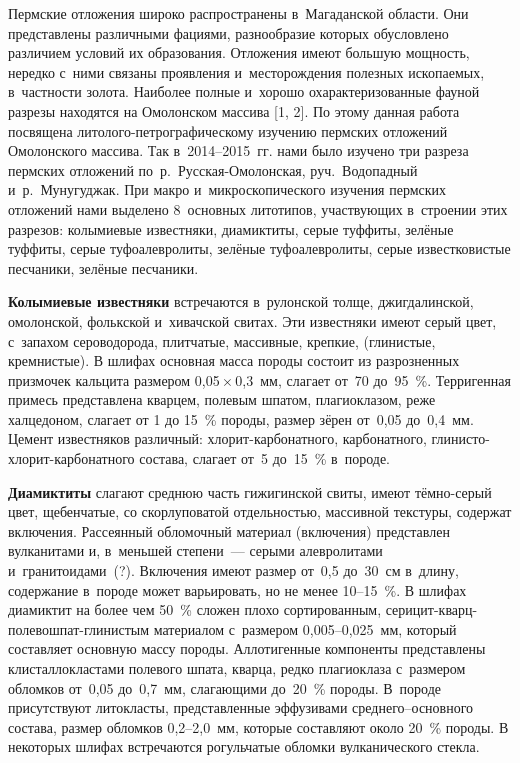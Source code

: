 




\makeProcTitleII
{}

\vspace{-10pt}
Пермские отложения широко распространены в~Магаданской области. Они представлены различными фациями, разнообразие которых обусловлено различием условий их образования. Отложения имеют большую мощность, нередко с~ними связаны проявления и~месторождения полезных ископаемых, в~частности золота. Наиболее полные и~хорошо охарактеризованные фауной разрезы находятся на Омолонском массива [1, 2]. По этому данная работа посвящена литолого-петрографическому изучению пермских отложений Омолонского массива. Так в~2014--2015~гг. нами было изучено три разреза пермских отложений по~р.~Русская-Омолонская, руч.~Водопадный и~р.~Мунугуджак. При макро и~микроскопического изучения пермских отложений нами выделено 8~основных литотипов, участвующих в~строении этих разрезов: колымиевые известняки, диамиктиты, серые туффиты, зелёные туффиты, серые туфоалевролиты, зелёные туфоалевролиты, серые известковистые песчаники, зелёные песчаники.

\textbf{Колымиевые известняки} встречаются в~рулонской толще, джигдалинской, омолонской, фолькской и~хивачской свитах. Эти известняки имеют серый цвет, с~запахом сероводорода, плитчатые, массивные, крепкие, (глинистые, кремнистые). В шлифах основная масса породы состоит из разрозненных призмочек кальцита размером 0,05\,$\times$\,0,3~мм, слагает от~70 до~95~\%. Терригенная примесь представлена кварцем, полевым шпатом, плагиоклазом, реже халцедоном, слагает от 1 до 15~\% породы, размер зёрен от~0,05 до~0,4~мм. Цемент известняков различный: хлорит-карбонатного, карбонатного, глинисто-хлорит-карбонатного состава, слагает от~5 до~15~\% в~породе.

\textbf{Диамиктиты} слагают среднюю часть гижигинской свиты, имеют тёмно-серый цвет, щебенчатые, со скорлуповатой отдельностью, массивной текстуры, содержат включения. Рассеянный обломочный материал (включения) представлен вулканитами и, в~меньшей степени~--- серыми алевролитами и~гранитоидами~(?). Включения имеют размер от~0,5 до~30~см в~длину, содержание в~породе может варьировать, но не менее 10--15~\%. В шлифах диамиктит на более чем 50~\% сложен плохо сортированным, серицит-кварц-полевошпат-глинистым материалом с~размером 0,005--0,025~мм, который составляет основную массу породы. Аллотигенные компоненты представлены клисталлокластами полевого шпата, кварца, редко плагиоклаза с~размером обломков от~0,05 до~0,7~мм, слагающими до~20~\% породы. В~породе присутствуют литокласты, представленные эффузивами среднего--основного состава, размер обломков 0,2--2,0~мм, которые составляют около 20~\% породы. В некоторых шлифах встречаются рогульчатые обломки вулканического стекла.

